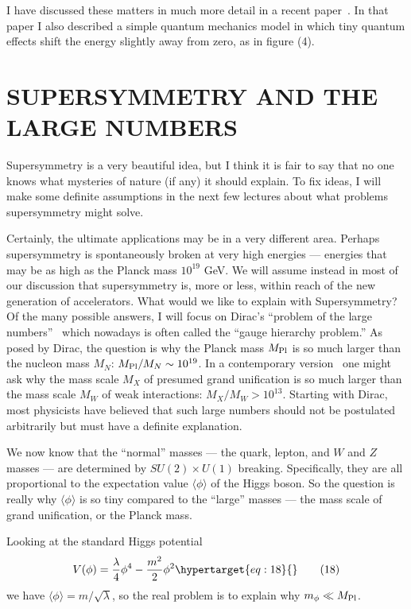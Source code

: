 \documentclass[11pt,a4paper]{article}
\newcommand{\eqtarget}[1]{\hypertarget{eq:#1}{\mathstrut}\tag{#1}}
\begin{document}
I have discussed these matters in much more detail in a recent
paper~\cite{ref6}. In that paper I also described a simple quantum mechanics
model in which tiny quantum effects shift the energy slightly away
from zero, as in figure (4).

\section{SUPERSYMMETRY AND THE LARGE NUMBERS}

Supersymmetry is a very beautiful idea, but I think it is fair
to say that no one knows what mysteries of nature (if any) it should
explain. To fix ideas, I will make some definite assumptions in the
next few lectures about what problems supersymmetry might solve.

Certainly, the ultimate applications may be in a very different area.
Perhaps supersymmetry is spontaneously broken at very high
energies --- energies that may be as high as the Planck mass $10^{19}$ GeV.
We will assume instead in most of our discussion that supersymmetry
is, more or less, within reach of the new generation of accelerators.
What would we like to explain with Supersymmetry? Of the many
possible answers, I will focus on Dirac's ``problem of the large numbers''~\cite{ref7}
which nowadays is often called the ``gauge hierarchy problem.''
As posed by Dirac, the question is why the Planck mass $M_{\rm Pl}$ is so much
larger than the nucleon mass $M_N$: $M_{\rm Pl}/M_N \sim 10^{19}$. In a contemporary
version~\cite{ref8} one might ask why the mass scale $M_X$ of presumed grand unification
is so much larger than the mass scale $M_W$ of weak interactions:
$M_X/M_W > 10^{13}$. Starting with Dirac, most physicists have believed
that such large numbers should not be postulated arbitrarily
but must have a definite explanation.

We now know that the ``normal'' masses --- the quark, lepton, and
$W$ and $Z$ masses --- are determined by $SU(2) \times U(1)$ breaking. Specifically,
they are all proportional to the expectation value $\langle \phi \rangle$ of the
Higgs boson. So the question is really why $\langle \phi \rangle$ is so tiny compared
to the ``large'' masses --- the mass scale of grand unification, or the
Planck mass.

Looking at the standard Higgs potential
\begin{equation}
V(\phi) = \frac{\lambda}{4}\phi^4 - \frac{m^2}{2}\phi^2
\eqtarget{18}
\end{equation}
we have $\langle \phi \rangle = m/\sqrt{\lambda}$, so the real problem is to explain why $m_\phi \ll M_{\rm Pl}$.
\end{document}
